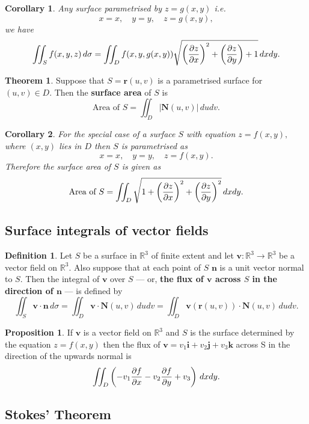 \documentclass[12pt, a4paper]{article}
\newcommand{\bb}[1]{\mathbb{#1}}
\newcommand{\mb}[1]{\mathbf{#1}}
\theoremstyle{definition}
\newtheorem{definition}{Definition}[section]
\newtheorem{theorem}{Theorem}[section]
\newtheorem{proposition}{Proposition}
\theoremstyle{plain}
\newtheorem{corollary}{Corollary}[theorem]
\begin{document}
\begin{corollary}
Any surface parametrised by $z=g(x,y)$ i.e. $$x=x, \quad y=y, \quad z=g(x,y),$$ we have $$\iint_S f(x,y,z) \,d\sigma=\iint_D f(x,y,g(x,y))\sqrt{\left(\pdv{z}{x}\right)^2+\left(\pdv{z}{y}\right)+1}\, dxdy.$$
\end{corollary}

\begin{theorem}
Suppose that $S=\mb{r}(u,v)$ is a parametrised surface for $(u,v)\in D$. Then the \textbf{surface area} of $S$ is $$\text{Area of }S =\iint_D |\mb{N}(u,v)| \, dudv.$$
\end{theorem}

\begin{corollary}
For the special case of a surface $S$ with equation $z=f(x,y),$ where $(x,y)$ lies in $D$ then $S$ is parametrised as $$x=x ,\quad y=y, \quad z=f(x,y).$$ Therefore the surface area of $S$ is given as $$\text{Area of }S =\iint_D \sqrt{1+\left(\pdv{z}{x}\right)^2+\left(\pdv{z}{y}\right)^2} \, dxdy.$$
\end{corollary}

\subsection{Surface integrals of vector fields}

\begin{definition}
Let $S$ be a surface in $\bb{R}^3$ of finite extent and let $\mb{v} : \bb{R}^3 \to \bb{R}^3$ be a vector field on $\bb{R}^3.$ Also suppose that at each point of $S$ $\mb{n}$ is a unit vector normal to $S.$ Then the integral of $\mb{v}$ over $S$ — or, \textbf{the flux of $\mb{v}$ across $S$ in the direction of $\mb{n}$} — is defined by $$\iint_S \mb{v}\cdot \mb{n} \, d\sigma = \iint_D \mb{v} \cdot \mb{N}(u,v) \, dudv =\iint_D \mb{v}(\mb{r}(u,v)) \cdot \mb{N}(u,v) \, dudv.$$
\end{definition}

\begin{proposition}
If $\mb{v}$ is a vector field on $\bb{R}^3$ and $S$ is the surface determined by the equation $z=f(x,y)$ then the flux of $\mb{v}=v_1\mb{i}+v_2\mb{j}+v_3\mb{k}$ across S in the direction of the upwards normal is $$\iint_D \left(-v_1\pdv{f}{x}-v_2\pdv{f}{y}+v_3\right) \, dxdy.$$
\end{proposition}

\subsection{Stokes' Theorem}
\end{document}
